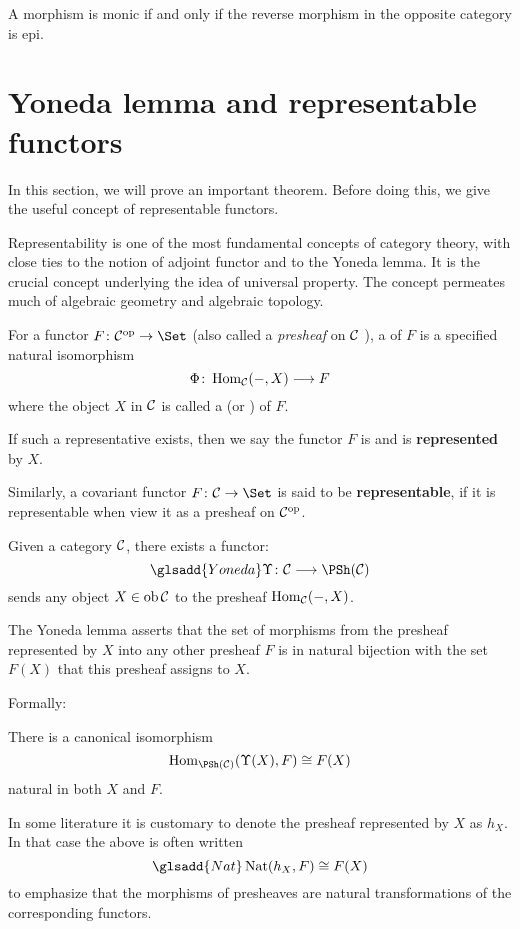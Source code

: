   \begin{exam}
    A morphism is monic if and only if the reverse morphism in the opposite category is epi.
  \end{exam}

\newpage\section{Yoneda lemma and representable functors}
  In this section, we will prove an important theorem. Before doing this, we give the useful concept of representable functors.

  Representability is one of the most fundamental concepts of category theory, with close ties to the notion of adjoint functor and to the Yoneda lemma. It is the crucial concept underlying the idea of universal property. The concept permeates much of algebraic geometry and algebraic topology.
  \begin{defn}
    For a functor $F\colon\Cc^{\op}\to\Set$ (also called a \emph{presheaf} on ${\cal C}$ ), a  of $F$ is a specified natural isomorphism
    \begin{equation*}
      \Phi\colon\operatorname{Hom}_{{\cal C}}(-,X)\longrightarrow F
    \end{equation*}
    where the object $X$ in ${\cal C}$ is called a  (or ) of $F$.

    If such a representative exists, then we say the functor $F$ is  and is \textbf{represented} by $X$.

    Similarly, a covariant functor $F\colon\Cc\to\Set$ is said to be \textbf{representable}, if it is representable when view it as a presheaf on ${\cal C}^{\operatorname{op}}$.
  \end{defn}

  Given a category ${\cal C}$, there exists a functor:
  \begin{equation*}\glsadd{Yoneda}
    \Upsilon\colon\Cc\To\PSh(\Cc)
  \end{equation*}
  sends any object $X\in\operatorname{ob}{\cal C}$ to the presheaf $\operatorname{Hom}_{{\cal C}}(-,X)$.

  The Yoneda lemma asserts that the set of morphisms from the presheaf represented by $X$ into any other presheaf $F$ is in natural bijection with the set $F(X)$ that this presheaf assigns to $X$.

  Formally:
  \begin{thm}
    There is a canonical isomorphism
    \begin{equation*}
      \Hom_{\PSh(\Cc)}(\Upsilon(X),F)\cong F(X)
    \end{equation*}
    natural in both $X$ and $F$.
  \end{thm}
  \begin{rem}
    In some literature it is customary to denote the presheaf represented by $X$ as $h_X$. In that case the above is often written
    \begin{equation*}\glsadd{Nat}
      \Nat(h_X,F)\cong F(X)
    \end{equation*}
    to emphasize that the morphisms of presheaves are natural transformations of the corresponding functors.
  \end{rem}

